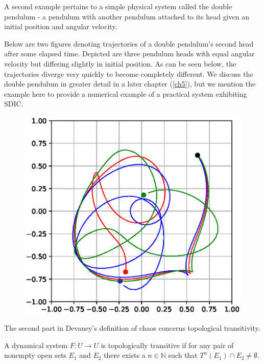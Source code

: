 \begin{Example} \rm
  A second example pertains to a simple physical system called the double pendulum - a pendulum with another pendulum attached to its head given an initial position and angular velocity.  

  Below are two figures denoting trajectories of a double pendulum's second head after some elapsed time. Depicted are three pendulum heads with equal angular velocity but differing slightly in initial position. As can be seen below, the trajectories diverge very quickly to become completely different. We discuss the double pendulum in greater detail in a later chapter (\ref{ch5}), but we mention the example here to provide a numerical example of a practical system exhibiting SDIC.

\begin{figure}[ht]
  \centering
\includegraphics[scale=0.8]{Graphs/_dp_sdic.eps}
    \label{fig:dp_sdic}
  \end{figure}

\end{Example}


The second part in Devaney's definition of chaos concerns topological transitivity.

\begin{Definition}
  \label{Dfn_TopolTrans}\rm
	A dynamical system $F: U \to U$ is topologically transitive if for any pair of nonempty open sets $E_1$ and $E_2$ there exists a $n\in\mathbb{N}$ such that $T^n(E_1) \cap E_2 \not= \emptyset$. 
\end{Definition}

